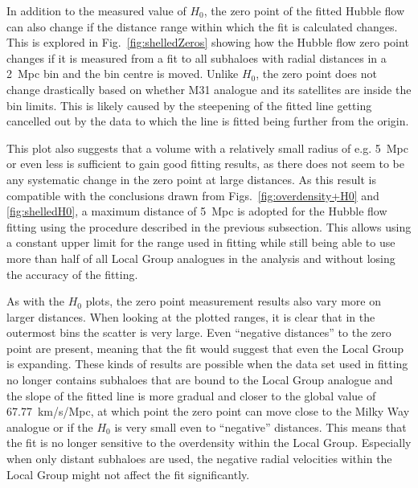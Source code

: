 \documentclass[english, twoside]{HYgradu}
\begin{document}


In addition to the measured value of $H_0$, the zero point of the fitted Hubble flow can also change if the distance range within which the fit is calculated changes. This is explored in Fig.~\ref{fig:shelledZeros} showing how the Hubble flow zero point changes if it is measured from a fit to all subhaloes with radial distances in a 2~Mpc bin and the bin centre is moved. Unlike $H_0$, the zero point does not change drastically based on whether M31 analogue and its satellites are inside the bin limits. This is likely caused by the steepening of the fitted line getting cancelled out by the data to which the line is fitted being further from the origin. 

This plot also suggests that a volume with a relatively small radius of e.g. 5~Mpc or even less is sufficient to gain good fitting results, as there does not seem to be any systematic change in the zero point at large distances. As this result is compatible with the conclusions drawn from Figs.~\ref{fig:overdensity+H0} and \ref{fig:shelledH0}, a maximum distance of 5~Mpc is adopted for the Hubble flow fitting using the procedure described in the previous subsection. This allows using a constant upper limit for the range used in fitting while still being able to use more than half of all Local Group analogues in the analysis and without losing the accuracy of the fitting.

As with the $H_0$ plots, the zero point measurement results also vary more on larger distances. When looking at the plotted ranges, it is clear that in the outermost bins the scatter is very large. Even ``negative distances'' to the zero point are present, meaning that the fit would suggest that even the Local Group is expanding. These kinds of results are possible when the data set used in fitting no longer contains subhaloes that are bound to the Local Group analogue and the slope of the fitted line is more gradual and closer to the global value of 67.77~km/s/Mpc, at which point the zero point can move close to the Milky Way analogue or if the $H_0$ is very small even to ``negative'' distances. This means that the fit is no longer sensitive to the overdensity within the Local Group. Especially when only distant subhaloes are used, the negative radial velocities within the Local Group might not affect the fit significantly.
\end{document}
